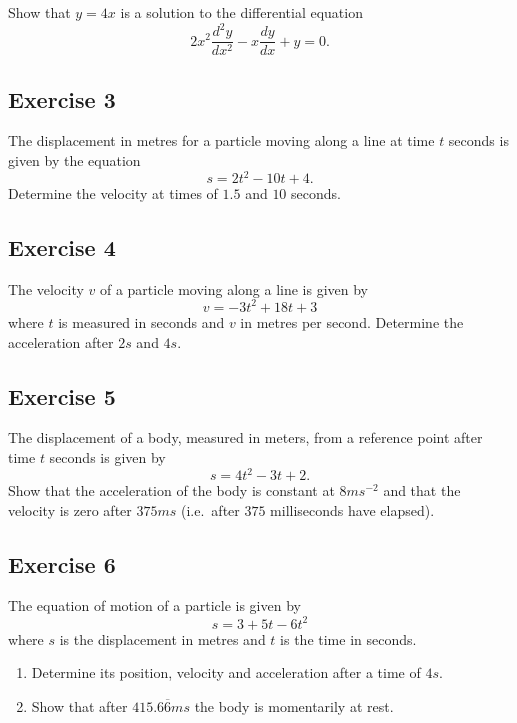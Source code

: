\documentclass[
  english,
  11pt,
  oneside]{book}
\providecommand{\tightlist}{%
  \setlength{\itemsep}{0pt}\setlength{\parskip}{0pt}}
\newcommand{\slide}{}
\theoremstyle{definition}
\theoremstyle{definition}
\theoremstyle{definition}
\theoremstyle{definition}
\theoremstyle{remark}
\begin{document}
Show that \(y=4x\) is a solution to the differential equation
\[2x^2\frac{d^2y}{dx^2}-x\frac{dy}{dx}+y=0.\]

\slide

\subsection*{Exercise 3}\label{exercise-3-1}

The displacement in metres for a particle moving along a line at time \(t\) seconds is given by the equation
\[s=2t^2-10t+4.\]
Determine the velocity at times of \(1.5\) and \(10\) seconds.

\slide

\subsection*{Exercise 4}\label{exercise-4-1}

The velocity \(v\) of a particle moving along a line is given by
\[v=-3t^2+18t+3\]
where \(t\) is measured in seconds and \(v\) in metres per second. Determine the acceleration after \(2s\) and \(4s\).
\slide

\subsection*{Exercise 5}\label{exercise-5}

The displacement of a body, measured in meters, from a reference point after time \(t\) seconds is given by
\[s=4t^2-3t+2.\]
Show that the acceleration of the body is constant at \(8ms^{-2}\) and that the velocity is zero after \(375ms\) (i.e.~after \(375\) milliseconds have elapsed).
\slide

\subsection*{Exercise 6}\label{exercise-6}

The equation of motion of a particle is given by
\[s=3+5t-6t^2\]
where \(s\) is the displacement in metres and \(t\) is the time in seconds.

\begin{enumerate}
\def\labelenumi{\alph{enumi}.}
\tightlist
\item
  Determine its position, velocity and acceleration after a time of \(4s\).
\item
  Show that after \(415.6\overline{6}ms\) the body is momentarily at rest.
\end{enumerate}
\end{document}
